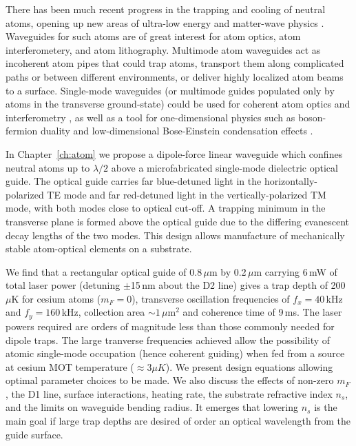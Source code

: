 There has been much recent
progress
in the
trapping and cooling of neutral atoms, opening up new areas of
ultra-low energy and matter-wave physics \cite{churev,cctrev,billrev}.
Waveguides for such atoms are of great interest for atom optics,
atom interferometery, and atom lithography.
Multimode atom waveguides act as
incoherent atom pipes
that could
trap atoms, transport them along complicated paths or
between different environments, or deliver
highly localized atom beams to a surface.
Single-mode waveguides (or multimode guides populated only by atoms in
the transverse
ground-state) could be used for coherent atom optics and interferometry
\cite{interf,adams}, as well as a tool for one-dimensional physics
such as boson-fermion duality
\cite{joseph,Maxim,1Deffects} and low-dimensional
Bose-Einstein condensation effects \cite{1Dbec}.


In Chapter~\ref{ch:atom} we propose a dipole-force
linear waveguide which confines neutral
atoms up to $\lambda/2$ above a
microfabricated single-mode dielectric optical guide.
%
The optical guide
carries
far blue-detuned light in the horizontally-polarized TE mode
and
far red-detuned light in the vertically-polarized TM mode,
with both modes close to optical
cut-off.
%
A trapping minimum
in the transverse plane is formed above the optical guide
due to
the differing evanescent
decay lengths of the two modes.
%
This design allows
manufacture of
mechanically stable atom-optical elements on a
substrate.


We find that a rectangular optical guide of 0.8\,$\mu$m by 0.2\,$\mu$m
carrying 6\,mW of total laser power
(detuning
$\pm$15\,nm about the D2 line)
gives a trap depth of 
200\,$\mu$K for cesium atoms ($m_F = 0$),
transverse oscillation frequencies of $f_x = 40$\,kHz and
$f_y = 160$\,kHz,
collection area $\sim 1\,\mu$m$^{2}$
and coherence time
of 9\,ms.
The laser powers required are orders of magnitude less than those commonly
needed for dipole traps.
The large tranverse frequencies achieved allow the possibility of
atomic single-mode occupation (hence coherent guiding) when
fed from a source at cesium MOT temperature ($\approx 3\mu K$).
We present design equations allowing optimal parameter choices to be made.
We also  discuss the effects of
non-zero $m_F$, the D1 line, surface interactions, heating rate,
the substrate refractive index $n_s$,
and the limits on waveguide bending radius.
It emerges that lowering $n_s$ is the main goal if large trap depths
are desired of order an optical wavelength from the guide surface.


